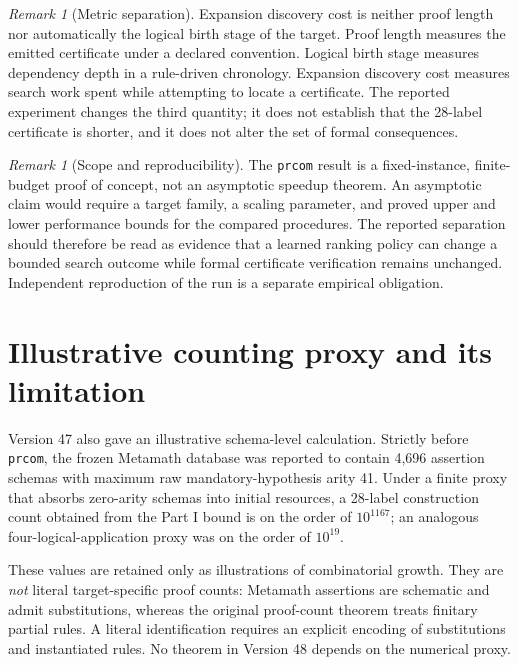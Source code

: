 \documentclass[11pt]{article}
\theoremstyle{remark}
\newtheorem{remark}[definition]{Remark}
\begin{document}
\begin{remark}[Metric separation]
Expansion discovery cost is neither proof length nor automatically the logical birth stage of the target. Proof length measures the emitted certificate under a declared convention. Logical birth stage measures dependency depth in a rule-driven chronology. Expansion discovery cost measures search work spent while attempting to locate a certificate. The reported experiment changes the third quantity; it does not establish that the 28-label certificate is shorter, and it does not alter the set of formal consequences.
\end{remark}

\begin{remark}[Scope and reproducibility]
The \texttt{prcom} result is a fixed-instance, finite-budget proof of concept, not an asymptotic speedup theorem. An asymptotic claim would require a target family, a scaling parameter, and proved upper and lower performance bounds for the compared procedures. The reported separation should therefore be read as evidence that a learned ranking policy can change a bounded search outcome while formal certificate verification remains unchanged. Independent reproduction of the run is a separate empirical obligation.
\end{remark}

\section{Illustrative counting proxy and its limitation}
Version 47 also gave an illustrative schema-level calculation. Strictly before \texttt{prcom}, the frozen Metamath database was reported to contain 4,696 assertion schemas with maximum raw mandatory-hypothesis arity 41. Under a finite proxy that absorbs zero-arity schemas into initial resources, a 28-label construction count obtained from the Part I bound is on the order of $10^{1167}$; an analogous four-logical-application proxy was on the order of $10^{19}$.

These values are retained only as illustrations of combinatorial growth. They are \emph{not} literal target-specific proof counts: Metamath assertions are schematic and admit substitutions, whereas the original proof-count theorem treats finitary partial rules. A literal identification requires an explicit encoding of substitutions and instantiated rules. No theorem in Version 48 depends on the numerical proxy.
\end{document}
